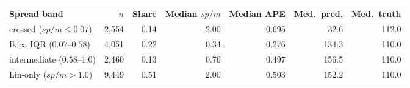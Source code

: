 \begin{tabular}{l rr rrrr}
\toprule
Spread band & $n$ & Share & Median $\mathit{sp/m}$ & Median APE & Med.\ pred. & Med.\ truth \\
\midrule
crossed ($\mathit{sp/m} \leq 0.07$) & 2,554 & 0.14 & -2.00 & 0.695 & 32.6 & 112.0 \\
Ikica IQR ($0.07$--$0.58$) & 4,051 & 0.22 & 0.34 & 0.276 & 134.3 & 110.0 \\
intermediate ($0.58$--$1.0$) & 2,460 & 0.13 & 0.76 & 0.497 & 156.5 & 110.0 \\
Lin-only ($\mathit{sp/m} > 1.0$) & 9,449 & 0.51 & 2.00 & 0.503 & 152.2 & 110.0 \\
\bottomrule
\end{tabular}
